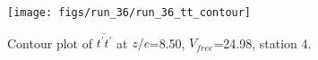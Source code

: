 \begin{figure}[H]
\centering
\texttt{[image: figs/run\_36/run\_36\_tt\_contour]}
\caption{Contour plot of $\overline{t^\prime t^\prime}$ at $z/c$=8.50, $V_{free}$=24.98, station 4.}
\label{fig:run_36_tt_contour}
\end{figure}


